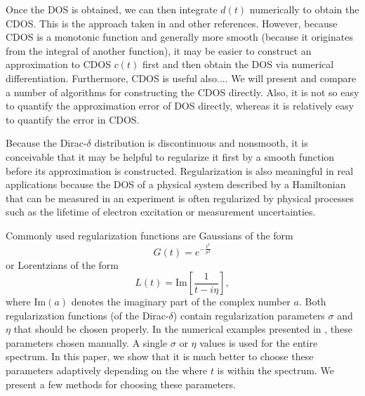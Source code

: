 \documentclass{article}
\begin{document}
Once the DOS is obtained, we can then integrate $d(t)$ numerically to obtain the CDOS.  This is the approach taken in \cite{LSY} and other references.  However, because CDOS is a monotonic function and generally more smooth (because it originates from the integral of another function), it may be easier to construct an approximation to CDOS $c(t)$ first and then obtain the DOS via numerical differentiation.  Furthermore, CDOS is useful also.... We will present and compare a number of algorithms for constructing the CDOS directly. Also, it is not so easy to quantify the approximation error of DOS directly, whereas it is relatively easy to quantify the error in CDOS.

Because the Dirac-$\delta$ distribution is discontinuous and nonsmooth, it is conceivable that it may be helpful to regularize it first by a smooth function before its approximation is constructed. Regularization is also meaningful in real applications because the DOS of a physical system described by a Hamiltonian that can be measured in an experiment is often regularized by physical processes such as the lifetime of electron excitation or measurement uncertainties.

Commonly used regularization functions are Gaussians of the form
\begin{equation}
    G(t) = e^{-\frac{t^2}{\sigma^2}}
    \label{eq:gauss}
\end{equation}
or Lorentzians of the form
\begin{equation}
    L(t) = \mathrm{Im}\left[\frac{1}{t - i\eta}\right],
    \label{eq:lorentz}
\end{equation}
where $\mathrm{Im}(a)$ denotes the imaginary part of the complex number $a$.
Both regularization functions (of the Dirac-$\delta$) contain regularization parameters $\sigma$ and $\eta$ that should be chosen properly.  In the numerical examples presented in \cite{LSY}, these parameters chosen manually. A single $\sigma$ or $\eta$ values is used for the entire spectrum. In this paper, we show that it is much better to choose these parameters adaptively depending on the where $t$ is within the spectrum. We present a few methods for choosing these parameters.
\end{document}
